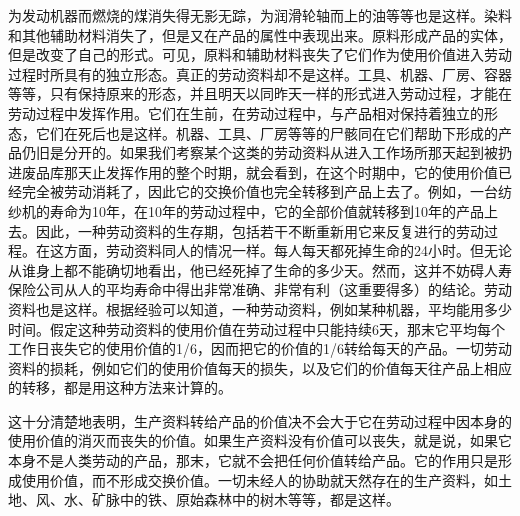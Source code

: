 \documentclass{ctexbook}
\begin{document}
为发动机器而燃烧的煤消失得无影无踪，为润滑轮轴而上的油等等也是这样。染料和其他辅助材料消失了，但是又在产品的属性中表现出来。原料形成产品的实体，但是改变了自己的形式。可见，原料和辅助材料丧失了它们作为使用价值进入劳动过程时所具有的独立形态。真正的劳动资料却不是这样。工具、机器、厂房、容器等等，只有保持原来的形态，并且明天以同昨天一样的形式进入劳动过程，才能在劳动过程中发挥作用。它们在生前，在劳动过程中，与产品相对保持着独立的形态，它们在死后也是这样。机器、工具、厂房等等的尸骸同在它们帮助下形成的产品仍旧是分开的。如果我们考察某个这类的劳动资料从进入工作场所那天起到被扔进废品库那天止发挥作用的整个时期，就会看到，在这个时期中，它的使用价值已经完全被劳动消耗了，因此它的交换价值也完全转移到产品上去了。例如，一台纺纱机的寿命为10年，在10年的劳动过程中，它的全部价值就转移到10年的产品上去。因此，一种劳动资料的生存期，包括若干不断重新用它来反复进行的劳动过程。在这方面，劳动资料同人的情况一样。每人每天都死掉生命的24小时。但无论从谁身上都不能确切地看出，他已经死掉了生命的多少天。然而，这并不妨碍人寿保险公司从人的平均寿命中得出非常准确、非常有利（这重要得多）的结论。劳动资料也是这样。根据经验可以知道，一种劳动资料，例如某种机器，平均能用多少时间。假定这种劳动资料的使用价值在劳动过程中只能持续6天，那末它平均每个工作日丧失它的使用价值的1/6，因而把它的价值的1/6转给每天的产品。一切劳动资料的损耗，例如它们的使用价值每天的损失，以及它们的价值每天往产品上相应的转移，都是用这种方法来计算的。

这十分清楚地表明，生产资料转给产品的价值决不会大于它在劳动过程中因本身的使用价值的消灭而丧失的价值。如果生产资料没有价值可以丧失，就是说，如果它本身不是人类劳动的产品，那末，它就不会把任何价值转给产品。它的作用只是形成使用价值，而不形成交换价值。一切未经人的协助就天然存在的生产资料，如土地、风、水、矿脉中的铁、原始森林中的树木等等，都是这样。
\end{document}
